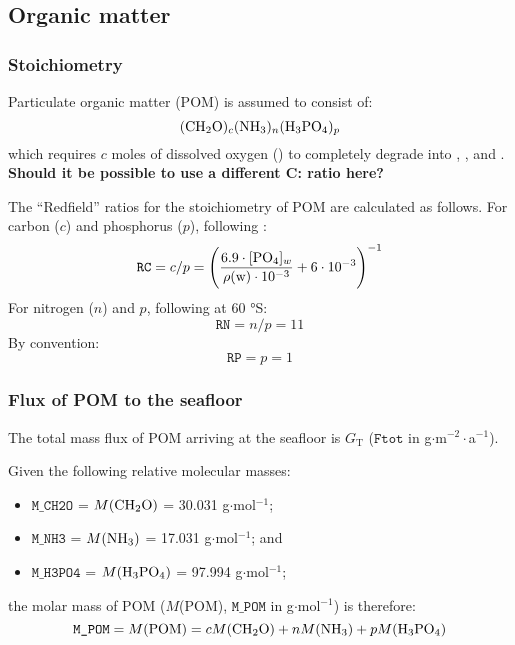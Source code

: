 \documentclass[a4paper]{article}
\newcommand{\code}[1]{\texttt{#1}}
\newcommand{\wtf}[1]{\textcolor{Cerulean}{\textbf{#1}}}
\begin{document}
\subsection{Organic matter}

\subsubsection{Stoichiometry}

Particulate organic matter (POM) is assumed to consist of:
\begin{equation}
(\ce{CH2O})_{c} (\ce{NH3})_{n} (\ce{H3PO4})_p
\end{equation}
which requires $c$ moles of dissolved oxygen () to completely degrade into , ,  and . \wtf{Should it be possible to use a different C: ratio here?}

The ``Redfield'' ratios for the stoichiometry of POM are calculated as follows. For carbon ($c$) and phosphorus ($p$), following \citet{galbraith_simple_2015}:
\begin{equation}
\code{RC} = c/p = \Bigg( \frac{6.9 \cdot [\ce{PO4}]_w}{\rho(\mathrm{w}) \cdot 10^{-3}} + 6\cdot10^{-3} \Bigg)^{-1}
\end{equation}
For nitrogen ($n$) and $p$, following \citet{martiny_strong_2013} at 60 $\si{\degree}$S:
\begin{equation}
\code{RN} = n/p = 11
\end{equation}
By convention:
\begin{equation}
\code{RP} = p = 1
\end{equation}


\subsubsection{Flux of POM to the seafloor}

The total mass flux of POM arriving at the seafloor is $G_\mathrm{T}$ ($\code{Ftot}$ in g$\cdot$m$^{-2}\cdot$a$^{-1}$).

Given the following relative molecular masses:
\begin{itemize}
  \item $\code{M\_CH2O}$ = $M(\ce{CH2O})$ = 30.031 g$\cdot$mol$^{-1}$;
  \item $\code{M\_NH3}$ = $M(\ce{NH3})$ = 17.031 g$\cdot$mol$^{-1}$; and
  \item $\code{M\_H3PO4}$ = $M(\ce{H3PO4})$ = 97.994 g$\cdot$mol$^{-1}$;
\end{itemize}
the molar mass of POM ($M$(POM), $\code{M\_POM}$ in g$\cdot$mol$^{-1}$) is therefore:
\begin{equation}
\code{M\_POM} = M(\mathrm{POM}) = c M(\ce{CH2O}) + n M(\ce{NH3}) + p M(\ce{H3PO4})
\end{equation}
\end{document}
